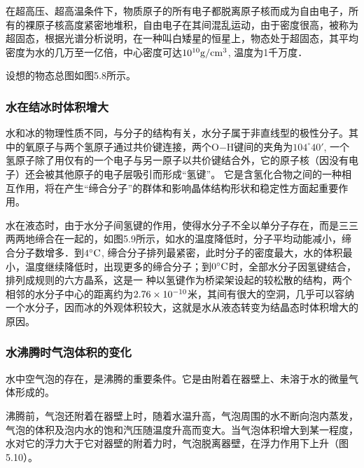 在超高压、超高温条件下，物质原子的所有电子都脱离原子核而成为自由电子，所有的裸原子核高度紧密地堆积，自由电子在其间混乱运动，由于密度很高，被称为超固态，根据光谱分析说明，在一种叫白矮星的恒星上，物态处于超固态，其平均密度为水的几万至一亿倍，中心密度可达$10^{10}{\rm g/cm^3}$, 温度为1千万度．

设想的物态总图如图5.8所示。
\begin{figure}[htp]
  \centering
  \caption{}
\end{figure}

\subsubsection{水在结冰时体积增大}

水和冰的物理性质不同，与分子的结构有关，水分子属于非直线型的极性分子。其中的氧原子与两个氢原子通过共价键连接，两个O$-$H键间的夹角为$104^{\circ}40'$, 一个氢原子除了用仅有的一个电子与另一原子以共价键结合外，它的原子核（因没有电子）还会被其他原子的电子层吸引而形成“氢键”。 它是含氢化合物之间的一种相互作用，将在产生“缔合分子”的群体和影响晶体结构形状和稳定性方面起重要作用。
\begin{figure}[htp]
  \centering
  \caption{}
\end{figure}

水在液态时，由于水分子间氢键的作用，使得水分子不全以单分子存在，而是三三两两地缔合在一起的，如图5.9所示，如水的温度降低时，分子平均动能减小，缔合分子数增多．到$4^{\circ}{\rm C}$, 缔合分子排列最紧密，此时分子的密度最大，水的体积最小，温度继续降低时，出现更多的缔合分子；到$0^{\circ}{\rm C}$时，全部水分子因氢键结合，排列成规则的六方晶系，这是一
种以氢键作为桥梁架设起的较松散的结构，两个相邻的水分子中心的距离约为$2. 76\times10^{-10}$米，其间有很大的空洞，几乎可以容纳一个水分子，因而冰的外观体积较大，这就是水从液态转变为结晶态时体积增大的原因。


\subsubsection{水沸腾时气泡体积的变化}

水中空气泡的存在，是沸腾的重要条件。它是由附着在器壁上、未溶于水的微量气体形成的。

沸腾前，气泡还附着在器壁上时，随着水温升高，气泡周围的水不断向泡内蒸发，气泡的体积及泡内水的饱和汽压随温度升高而变大。当气泡体积增大到某一程度，水对它的浮力大于它对器壁的附着力时，气泡脱离器壁，在浮力作用下上升（图5.10）。
\begin{figure}[htp]
  \centering
  \caption{}
\end{figure}

